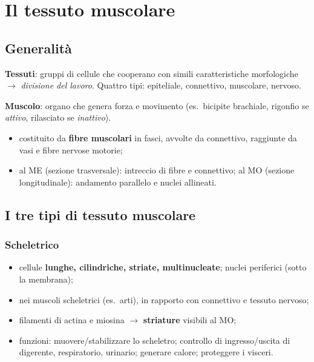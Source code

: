 \chapter{Il tessuto muscolare}

\section{Generalità}

\textbf{Tessuti}: gruppi di cellule che cooperano con simili caratteristiche morfologiche
$\rightarrow$ \textit{divisione del lavoro}. Quattro tipi: epiteliale, connettivo, muscolare,
nervoso.

\textbf{Muscolo}: organo che genera forza e movimento (es.\ bicipite brachiale, rigonfio se
\textit{attivo}, rilasciato se \textit{inattivo}).
\begin{itemize}
  \item costituito da \textbf{fibre muscolari} in fasci, avvolte da connettivo, raggiunte da vasi e
    fibre nervose motorie;
  \item al ME (sezione trasversale): intreccio di fibre e connettivo; al MO (sezione longitudinale):
    andamento parallelo e nuclei allineati.
\end{itemize}

\section{I tre tipi di tessuto muscolare}

\subsection{Scheletrico}
\begin{itemize}
  \item cellule \textbf{lunghe, cilindriche, striate, multinucleate}; nuclei periferici (sotto la
    membrana);
  \item nei muscoli scheletrici (es.\ arti), in rapporto con connettivo e tessuto nervoso;
  \item filamenti di actina e miosina $\rightarrow$ \textbf{striature} visibili al MO;
  \item funzioni: muovere/stabilizzare lo scheletro; controllo di ingresso/uscita di digerente,
    respiratorio, urinario; generare calore; proteggere i visceri.
\end{itemize}

